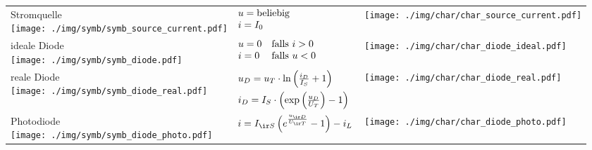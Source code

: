 \documentclass[fs, footer]{latex4ei}
\begin{document}
\begin{multicols*}{4}
\begin{tabular}{@{}p{1.1cm}p{2.9cm}l}
        \parbox{1.3cm}{ Stromquelle  \\[3pt] \texttt{[image: ./img/symb/symb\_source\_current.pdf]} }& $\begin{array}{@{}ll} u = \mathrm{beliebig} \\ i = I_0 \end{array}$ & \parbox{1.8cm}{\texttt{[image: ./img/char/char\_source\_current.pdf]} }    \\ \mrule
        \parbox{1.3cm}{ ideale Diode \\[5pt] \texttt{[image: ./img/symb/symb\_diode.pdf]} }& $\begin{array}{@{}ll} u = 0 & \text{falls } i > 0 \\ i = 0 & \text{falls } u < 0\end{array}$ & \parbox{1.8cm}{\texttt{[image: ./img/char/char\_diode\_ideal.pdf]} } \\ \mrule
        \parbox{1.3cm}{ reale Diode  \\[5pt] \texttt{[image: ./img/symb/symb\_diode\_real.pdf]} }& $\begin{array}{@{}ll} u_D = u_T \cdot \ln \left(\frac{i_D}{I_S} + 1 \right) \\[0.7em] i_D = I_S \cdot \left( \exp \left(\frac{u_D}{U_T}\right) -1 \right) \end{array}$ & \parbox{1.8cm}{\texttt{[image: ./img/char/char\_diode\_real.pdf]} } \\ \mrule
        \parbox{1.3cm}{ Photodiode   \\ \texttt{[image: ./img/symb/symb\_diode\_photo.pdf]} }& $i = I_{\ir S} \left( e^{\frac{u_{\ir D}}{U_{\ir T}}} -1 \right) - i_L$ & \parbox{1.8cm}{\texttt{[image: ./img/char/char\_diode\_photo.pdf]} } \\
    \end{tabular}






\end{multicols*}
\end{document}
